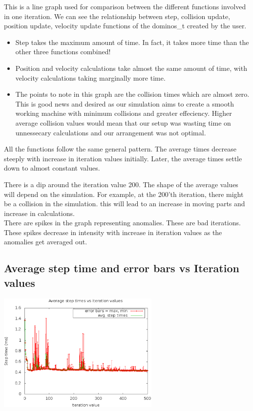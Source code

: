 \documentclass[a4paper,11pt]{article}
\begin{document}
This is a line graph used for comparison between the different functions involved in one iteration. We can see the relationship between step, collision update, position update, velocity update functions of the dominos\_t created by the user. 

\begin{itemize}
  \item Step takes the maximum amount of time. In fact, it takes more time than the other three functions combined!
  \item Position and velocity calculations take almost the same amount of time, with velocity calculations taking marginally more time. 
  \item The points to note in this graph are the collision times which are almost zero. This is good news and desired as our simulation aims to create a smooth working machine with minimum collisions and greater effeciency. Higher average collision values would mean that our setup was wasting time on unnessecary calculations and our arrangement was not optimal.   

\end{itemize}

All the functions follow the same general pattern. The average times decrease steeply with increase in iteration values initially. Later, the average times settle down to almost constant values. 

There is a dip around the iteration value 200. The shape of the average values will depend on the simulation. For example, at the 200'th iteration, there might be a collision in the simulation. this will lead to an increase in moving parts and increase in calculations.\\

There are spikes in the graph representing anomalies. These are bad iterations. These spikes decrease in intensity with increase in iteration values as the anomalies get averaged out. 


\subsection{Average step time and error bars vs Iteration values}

\begin{center}
\includegraphics[width=0.6\textwidth]{plots/g05_plot03.eps} 
\end{center}
\end{document}
